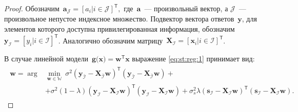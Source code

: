\begin{proof}
Обозначим~$\mathbf{a}_{\mathcal{J}} = [a_i| i \in \mathcal{J}]^{\mathsf{T}},$ где~$\mathbf{a}$~--- произвольный вектор, а $\mathcal{J}$~--- произвольное непустое индексное множество. Подвектор вектора ответов~$\mathbf{y}$, для элементов которого доступна привилегированная информация, обозначим $\mathbf{y}_{\mathcal{I}} = [y_i| i \in \mathcal{I}]^{\mathsf{T}}$. Аналогично обозначим матрицу~$\mathbf{X}_\mathcal{I}=[\mathbf{x}_{i}| i \in \mathcal{I}]^{\mathsf{T}}$.

В случае линейной модели~$\mathbf{g}\bigr(\mathbf{x}\bigr) = \mathbf{w}^{\mathsf{T}}\mathbf{x}$ выражение \eqref{eq:st:reg:1} принимает вид:
\begin{gather}
\label{eq:st:reg:2}
\begin{aligned}
\hat{\mathbf{w}} = \arg&\min_{\mathbf{w}\in \mathbb{W}} ~ \sigma^2\left(\mathbf{y}_{\bar{\mathcal{I}}}-\mathbf{X}_{\bar{\mathcal{I}}}\mathbf{w}\right)^{\mathsf{T}}\left(\mathbf{y}_{\bar{\mathcal{I}}}-\mathbf{X}_{\bar{\mathcal{I}}}\mathbf{w}\right) +\\
&+ \sigma^2\left(1-\lambda\right)\left(\mathbf{y}_{\mathcal{I}}-\mathbf{X}_{\mathcal{I}}\mathbf{w}\right)^{\mathsf{T}}\left(\mathbf{y}_{\mathcal{I}}-\mathbf{X}_{\mathcal{I}}\mathbf{w}\right) + \sigma^2_s\lambda\left(\mathbf{s}_{\mathcal{I}}-\mathbf{X}_{\mathcal{I}}\mathbf{w}\right)^{\mathsf{T}}\left(\mathbf{s}_{\mathcal{I}}-\mathbf{X}_{\mathcal{I}}\mathbf{w}\right).
\end{aligned}
\end{gather}


\end{proof}
